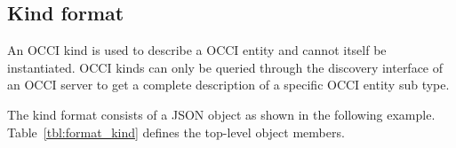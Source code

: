 \documentclass[10pt,a4paper]{article}
\begin{document}
%
%

\subsection{Kind format}
\label{sec:format_discovery}

\label{sec:format_kind}

An OCCI kind is used to describe a OCCI entity and cannot itself be 
instantiated. OCCI kinds can only be queried through the discovery interface 
of an OCCI server to get a complete description of a specific OCCI entity sub type.

The kind format consists of a JSON object as shown in the
following example.
Table~\ref{tbl:format_kind} defines the top-level object members.
\end{document}
